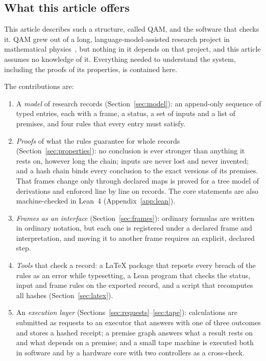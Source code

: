 \subsection{What this article offers}

This article describes such a structure, called QAM, and the software that checks it. QAM grew out of a long, language-model-assisted
research project in mathematical physics~\cite{repo}, but nothing in it depends on that project, and this article assumes no
knowledge of it. Everything needed to understand the system, including the proofs of its properties, is contained here.

The contributions are:
\begin{enumerate}[leftmargin=1.5em]
\item A \emph{model} of research records (Section~\ref{sec:model}): an append-only sequence of typed entries, each with a frame, a
status, a set of inputs and a list of premises, and four rules that every entry must satisfy.
\item \emph{Proofs} of what the rules guarantee for whole records (Section~\ref{sec:properties}): no conclusion is ever stronger than
anything it rests on, however long the chain; inputs are never lost and never invented;
and a hash chain binds every conclusion to the exact versions of its premises. That frames change only through declared maps is proved for a tree model of derivations and enforced line by line on
records. The core statements are also machine-checked in Lean~4
(Appendix~\ref{app:lean}).
\item \emph{Frames as an interface} (Section~\ref{sec:frames}): ordinary formulas are written in ordinary notation, but each one is
registered under a declared frame and interpretation, and moving it to another frame requires an explicit, declared step.
\item \emph{Tools} that check a record: a \LaTeX{} package that reports every breach of the rules as an error while typesetting,
a Lean program that checks the status, input and frame rules on the exported record, and a script that recomputes all hashes (Section~\ref{sec:latex}).
\item An \emph{execution layer} (Sections~\ref{sec:requests}--\ref{sec:tape}): calculations are submitted as requests to an executor
that answers with one of three outcomes and stores a hashed receipt; a premise graph answers what a result rests on and what
depends on a premise; and a small tape machine is executed both in software and by a hardware core with two controllers as a cross-check.
\end{enumerate}

